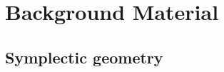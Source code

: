 \documentclass[handout,10pt]{beamer}
\begin{document}

\section{Background Material}


\subsection{Symplectic geometry}
\end{document}
